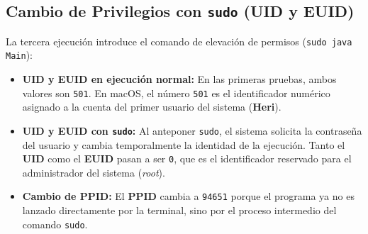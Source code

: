 \documentclass[12pt,oneside]{template/liverpoolthesis}
\begin{document}
\subsection{Cambio de Privilegios con \texttt{sudo} (UID y EUID)}

La tercera ejecución introduce el comando de elevación de permisos (\texttt{sudo java Main}):
\begin{itemize}
    \item \textbf{UID y EUID en ejecución normal:} En las primeras pruebas, ambos valores son \texttt{501}. En macOS, el número \texttt{501} es el identificador numérico asignado a la cuenta del primer usuario del sistema (\textbf{Heri}).
    \item \textbf{UID y EUID con \texttt{sudo}:} Al anteponer \texttt{sudo}, el sistema solicita la contraseña del usuario y cambia temporalmente la identidad de la ejecución. Tanto el \textbf{UID} como el \textbf{EUID} pasan a ser \texttt{0}, que es el identificador reservado para el administrador del sistema (\textit{root}).
    \item \textbf{Cambio de PPID:} El \textbf{PPID} cambia a \texttt{94651} porque el programa ya no es lanzado directamente por la terminal, sino por el proceso intermedio del comando \texttt{sudo}.
\end{itemize}

\cleardoublepage
{}
{}
\nocite{*} %

\end{document}
